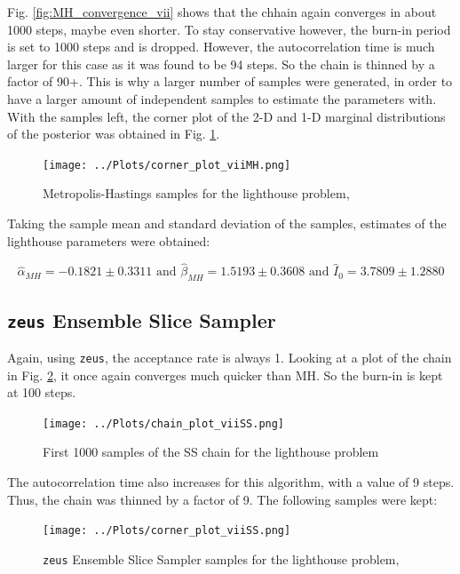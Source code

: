\documentclass[12pt]{report} %
\begin{document}
Fig. \ref{fig:MH_convergence_vii} shows that the chhain again converges in about 1000 steps, maybe even shorter. To stay conservative however, the burn-in period is set to 1000 steps and is dropped. However, the autocorrelation time is much larger for this case as it was found to be 94 steps. So the chain is thinned by a factor of 90+. This is why a larger number of samples were generated, in order to have a larger amount of independent samples to estimate the parameters with. With the samples left, the corner plot of the 2-D and 1-D marginal distributions of the posterior was obtained in Fig. \ref{fig:MH_samples_vii}.

\begin{figure}[!htbp]
\centering
\texttt{[image: ../Plots/corner\_plot\_viiMH.png]}
\caption{Metropolis-Hastings samples for the lighthouse problem, }
\label{fig:MH_samples_vii}
\end{figure}

Taking the sample mean and standard deviation of the samples, estimates of the lighthouse parameters were obtained:

\begin{equation}
    \hat{\alpha}_{MH} = -0.1821 \pm 0.3311 \text{ and } \hat{\beta}_{MH} = 1.5193 \pm 0.3608 \text{ and } \hat{I}_{0} = 3.7809 \pm 1.2880
\end{equation}

\newpage
\subsection{\texttt{zeus} Ensemble Slice Sampler}

Again, using \texttt{zeus}, the acceptance rate is always 1. Looking at a plot of the chain in Fig. \ref{fig:SS_convergence_vii}, it once again converges much quicker than MH. So the burn-in is kept at 100 steps.


\begin{figure}[h]
    \centering
    \texttt{[image: ../Plots/chain\_plot\_viiSS.png]}
    \caption{First 1000 samples of the SS chain for the lighthouse problem}
    \label{fig:SS_convergence_vii}
    \end{figure}

The autocorrelation time also increases for this algorithm, with a value of 9 steps. Thus, the chain was thinned by a factor of 9. The following samples were kept:

\newpage

\begin{figure}[h]
\centering
\texttt{[image: ../Plots/corner\_plot\_viiSS.png]}
\caption{\texttt{zeus} Ensemble Slice Sampler samples for the lighthouse problem, }
\label{fig:SS_samples_vii}
\end{figure}
\end{document}
